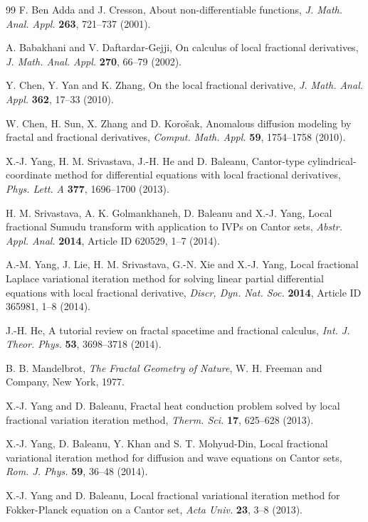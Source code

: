 \documentclass[10pt]{NSP1}
\begin{document}
\begin{thebibliography}{99}
F. Ben Adda and J. Cresson, About non-differentiable functions,
{\it J. Math. Anal. Appl.} {\bf 263}, 721--737 (2001).

A. Babakhani and V. Daftardar-Gejji, On calculus of local fractional derivatives,
{\it J. Math. Anal. Appl.} {\bf 270}, 66--79 (2002).

Y. Chen, Y. Yan and K. Zhang, On the local fractional derivative,
{\it J. Math. Anal. Appl.} {\bf 362}, 17--33 (2010).

W. Chen, H. Sun, X. Zhang and D. Koro\v{s}ak, Anomalous diffusion modeling by
fractal and fractional derivatives, {\it Comput. Math.
Appl.} {\bf 59}, 1754--1758 (2010).

X.-J. Yang, H. M. Srivastava, J.-H. He and D. Baleanu,
Cantor-type cylindrical-coordinate method for differential equations
with local fractional derivatives, {\it Phys. Lett. A}
{\bf 377}, 1696--1700 (2013).

H. M. Srivastava, A. K. Golmankhaneh, D. Baleanu and X.-J. Yang,
Local fractional Sumudu transform with application to IVPs on Cantor sets,
{\it Abstr. Appl. Anal.} {\bf 2014}, Article ID 620529, 1--7 (2014).

A.-M. Yang, J. Lie, H. M. Srivastava, G.-N. Xie and X.-J. Yang,
Local fractional Laplace variational iteration method for solving
linear partial differential equations with local fractional derivative,
{\it Discr, Dyn. Nat. Soc.} {\bf 2014}, Article ID 365981, 1--8 (2014).

J.-H. He, A tutorial review on
fractal spacetime and fractional calculus,
{\it Int. J. Theor. Phys.} {\bf 53}, 3698--3718 (2014).

B. B. Mandelbrot, {\it The Fractal Geometry of Nature},
W. H. Freeman and Company, New York, 1977.

X.-J. Yang and D. Baleanu, Fractal heat conduction problem solved by local
fractional variation iteration method, {\it Therm. Sci.}
{\bf 17}, 625--628 (2013).

X.-J. Yang, D. Baleanu, Y. Khan and S. T. Mohyud-Din,
Local fractional variational iteration method for
diffusion and wave equations on Cantor sets,
{\it Rom. J. Phys.} {\bf 59}, 36--48 (2014).

X.-J. Yang and D. Baleanu, Local fractional variational iteration
method for Fokker-Planck equation on a Cantor set,
{\it Acta Univ.} {\bf 23}, 3--8 (2013).


\end{thebibliography}
\end{document}
